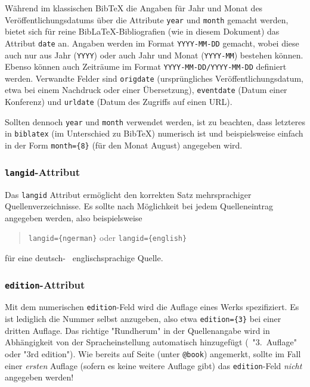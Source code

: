 Während im klassischen BibTeX die Angaben für Jahr und Monat des
Veröffentlichungsdatums über die Attribute \texttt{year} und \texttt{month}
gemacht werden, bietet sich für reine BibLaTeX-Bibliografien (wie in diesem
Dokument) das Attribut \texttt{date} an. Angaben werden im Format
\texttt{YYYY-MM-DD} gemacht, wobei diese auch nur aus Jahr (\texttt{YYYY})
oder auch Jahr und Monat (\texttt{YYYY-MM}) bestehen können. Ebenso können
auch Zeiträume im Format \texttt{YYYY-MM-DD/YYYY-MM-DD} definiert werden.
Verwandte Felder sind \texttt{origdate} (ursprüngliches
Veröffentlichungsdatum, etwa bei einem Nachdruck oder einer Übersetzung),
\texttt{eventdate} (Datum einer Konferenz) und \texttt{urldate} (Datum des
Zugriffs auf einen URL).

Sollten dennoch \texttt{year} und \texttt{month} verwendet werden, ist zu
beachten, dass letzteres in \texttt{biblatex} (im Unterschied zu BibTeX)
numerisch ist und beispielsweise einfach in der Form \verb!month={8}! (für
den Monat August) angegeben wird.

\subsubsection{\texttt{langid}-Attribut}

Das \texttt{langid} Attribut ermöglicht den korrekten Satz mehrsprachiger
Quellenverzeichnisse. Es sollte nach Möglichkeit bei jedem Quelleneintrag
angegeben werden, also beispielsweise
%
\begin{quote}
\verb!langid={ngerman}! \quad oder \quad \verb!langid={english}!
\end{quote}
%
für eine deutsch- \bzw\ englischsprachige Quelle.

\subsubsection{\texttt{edition}-Attribut}

Mit dem numerischen \texttt{edition}-Feld wird die Auflage eines Werks
spezifiziert. Es ist lediglich die Nummer selbst anzugeben, also etwa
\verb!edition={3}! bei einer dritten Auflage. Das richtige "Rundherum" in der
Quellenangabe wird in Abhängigkeit von der Spracheinstellung automatisch
hinzugefügt (\zB\ "3.\ Auflage" oder "3rd edition"). Wie bereits auf Seite
\pageref{sec:@book} (unter \texttt{@book}) angemerkt, sollte im Fall einer
\emph{ersten} Auflage (sofern es keine weitere Auflage gibt) das
\texttt{edition}-Feld \emph{nicht} angegeben werden!


